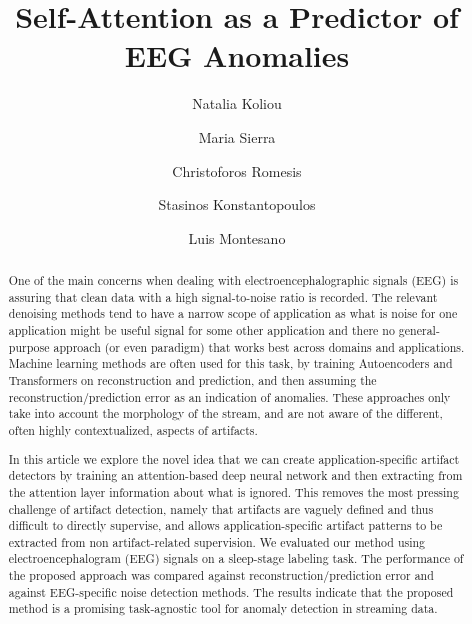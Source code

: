 \documentclass[runningheads]{llncs}
\begin{document}
\title{Self-Attention as a Predictor of EEG Anomalies}

\author{Natalia Koliou \and
Maria Sierra \and
Christoforos Romesis \and
Stasinos Konstantopoulos \and
Luis Montesano
}

  


\maketitle

\begin{abstract}

One of the main concerns when dealing with electroencephalographic
signals (EEG) is assuring that clean data with a high signal-to-noise
ratio is recorded. The relevant denoising methods tend to have
a narrow scope of application as what is noise for one
application might be useful signal for some other application and
there no general-purpose approach (or even paradigm) that works best
across domains and applications.
%
Machine learning methods are often used for this task, by
training Autoencoders and Transformers on reconstruction and
prediction, and then assuming the reconstruction/prediction error as
an indication of anomalies. These approaches only take into account
the morphology of the stream, and are not aware of the different,
often highly contextualized, aspects of artifacts.

In this article we explore the novel idea that we can create
application-specific artifact detectors by training an
attention-based deep neural network and then extracting from the
attention layer information about what is ignored.
This removes the most pressing challenge of artifact detection, namely
that artifacts are vaguely defined and thus difficult to directly
supervise, and allows application-specific artifact patterns to be
extracted from non artifact-related supervision.
%
We evaluated our method using electroencephalogram (EEG) signals on a
sleep-stage labeling task. The performance of the proposed approach
was compared against reconstruction/prediction error and against
EEG-specific noise detection methods. The results indicate that the
proposed method is a promising task-agnostic tool for anomaly
detection in streaming data.

\end{abstract}
\end{document}

